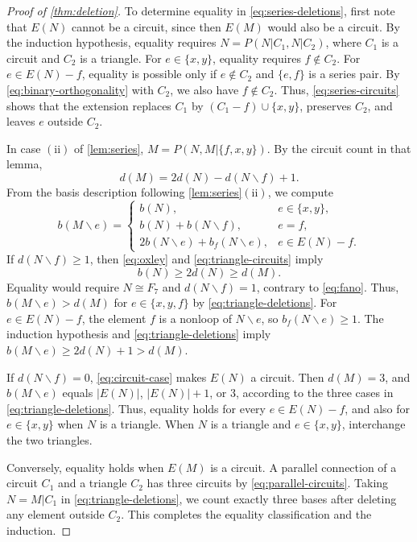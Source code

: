 \documentclass[11pt]{article}
\numberwithin{equation}{section}
\begin{document}
\begin{proof}[Proof of \autoref{thm:deletion}]
To determine equality in \eqref{eq:series-deletions}, first note that
\(E(N)\) cannot be a circuit, since then \(E(M)\) would
also be a circuit. By the induction hypothesis, equality
requires \(N=P(N|C_1,N|C_2)\), where \(C_1\) is a circuit
and \(C_2\) is a triangle.
For \(e\in\{x,y\}\), equality requires \(f\notin C_2\).
For \(e\in E(N)-f\), equality is possible only if \(e\notin C_2\)
and \(\{e,f\}\) is a series pair. By \eqref{eq:binary-orthogonality} with \(C_2\),
we also have \(f\notin C_2\).
Thus, \eqref{eq:series-circuits} shows that the extension replaces \(C_1\) by
\((C_1-f)\cup\{x,y\}\), preserves \(C_2\), and leaves \(e\)
outside \(C_2\).

In case \(\mathrm{(ii)}\) of \autoref{lem:series},
\(M=P(N,M|\{f,x,y\})\). By the circuit count in that lemma,
\begin{equation}\label{eq:triangle-circuits}
 d(M)=2d(N)-d(N\backslash f)+1.
\end{equation}
From the basis description following \autoref{lem:series}\(\mathrm{(ii)}\),
we compute
\begin{equation}\label{eq:triangle-deletions}
 b(M\backslash e)=
 \begin{cases}
 b(N),&e\in\{x,y\},\\
 b(N)+b(N\backslash f),&e=f,\\
 2b(N\backslash e)+b_f(N\backslash e),&e\in E(N)-f.
 \end{cases}
\end{equation}
If \(d(N\backslash f)\ge1\), then \eqref{eq:oxley} and
\eqref{eq:triangle-circuits} imply
\[
 b(N)\ge2d(N)\ge d(M).
\]
Equality would require \(N\cong F_7\) and
\(d(N\backslash f)=1\), contrary to \eqref{eq:fano}.
Thus, \(b(M\backslash e)>d(M)\) for \(e\in\{x,y,f\}\)
by \eqref{eq:triangle-deletions}.
For \(e\in E(N)-f\), the element \(f\) is a nonloop of
\(N\backslash e\), so \(b_f(N\backslash e)\ge1\).
The induction hypothesis and \eqref{eq:triangle-deletions}
imply \(b(M\backslash e)\ge2d(N)+1>d(M)\).

If \(d(N\backslash f)=0\), \eqref{eq:circuit-case} makes
\(E(N)\) a circuit. Then \(d(M)=3\), and \(b(M\backslash e)\) equals
\(|E(N)|\), \(|E(N)|+1\), or \(3\), according to the three cases in
\eqref{eq:triangle-deletions}.
Thus, equality holds for every \(e\in E(N)-f\),
and also for \(e\in\{x,y\}\) when \(N\) is a triangle.
When \(N\) is a triangle and \(e\in\{x,y\}\), interchange the two triangles.

Conversely, equality holds when \(E(M)\) is a circuit. A parallel connection
of a circuit \(C_1\) and a triangle \(C_2\) has three circuits
by \eqref{eq:parallel-circuits}.
Taking \(N=M|C_1\) in \eqref{eq:triangle-deletions}, we count
exactly three bases after deleting any element outside \(C_2\).
This completes the equality classification and the induction.
\end{proof}
\end{document}
